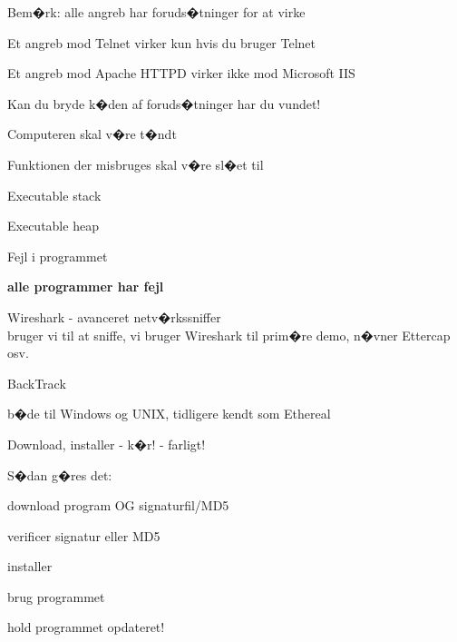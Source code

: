\documentclass[20pt,landscape,a4paper,footrule]{foils}
\begin{document}

\begin{list1}
\item Bem�rk: alle angreb har foruds�tninger for at virke
\item Et angreb mod Telnet virker kun hvis du bruger Telnet
\item Et angreb mod Apache HTTPD virker ikke mod Microsoft IIS
\item Kan du bryde k�den af foruds�tninger har du vundet!
\end{list1}



\begin{list1}
\item Computeren skal v�re t�ndt
\item Funktionen der misbruges skal v�re sl�et til
\item Executable stack
\item Executable heap
\item Fejl i programmet
\end{list1}
\pause
\vskip 2cm

\centerline{\color{titlecolor}\LARGE \bf alle programmer har fejl}






\begin{list1}
\item Wireshark -  avanceret netv�rkssniffer\\
bruger vi til at sniffe, vi bruger Wireshark til prim�re demo, n�vner Ettercap osv.
\item BackTrack 
\end{list1}



\centerline{}
\centerline{b�de til Windows og UNIX, tidligere kendt som Ethereal}


\begin{list1}
  \item {\color{red}Download, installer - k�r!} - farligt!
\item S�dan g�res det:
  \begin{list2}
    \item download program OG signaturfil/MD5
\item verificer signatur eller MD5
\item installer
\item brug programmet
\item hold programmet opdateret!

\end{list2}
\end{list1}
\end{document}
